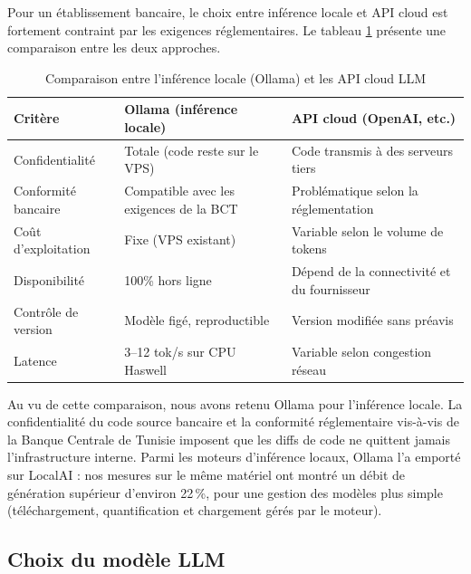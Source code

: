         Pour un établissement bancaire, le choix entre inférence locale et API cloud est
        fortement contraint par les exigences réglementaires. Le tableau \ref{tab:ollama_vs_cloud}
        présente une comparaison entre les deux approches.

        \begin{table}[H]
        \centering
        \begin{tabular}{|m{3.5cm}|m{5cm}|m{5cm}|}
        \hline
        \textbf{Critère} & \textbf{Ollama (inférence locale)} & \textbf{API cloud (OpenAI, etc.)} \\
        \hline
        Confidentialité & Totale (code reste sur le VPS) & Code transmis à des serveurs tiers \\
        \hline
        Conformité bancaire & Compatible avec les exigences de la BCT & Problématique selon la réglementation \\
        \hline
        Coût d'exploitation & Fixe (VPS existant) & Variable selon le volume de tokens \\
        \hline
        Disponibilité & 100\% hors ligne & Dépend de la connectivité et du fournisseur \\
        \hline
        Contrôle de version & Modèle figé, reproductible & Version modifiée sans préavis \\
        \hline
        Latence & 3–12 tok/s sur CPU Haswell & Variable selon congestion réseau \\
        \hline
        \end{tabular}
        \caption{Comparaison entre l'inférence locale (Ollama) et les API cloud LLM}
        \label{tab:ollama_vs_cloud}
        \end{table}

        Au vu de cette comparaison, nous avons retenu Ollama
        \cite{Ollama} pour l'inférence locale. La confidentialité du code source bancaire
        et la conformité réglementaire vis-à-vis de la Banque Centrale de Tunisie imposent
        que les diffs de code ne quittent jamais l'infrastructure interne. Parmi les
        moteurs d'inférence locaux, Ollama l'a emporté sur LocalAI \cite{LocalAI} :
        nos mesures sur le même matériel ont montré un débit de génération supérieur
        d'environ 22\,\%, pour une gestion des modèles plus simple (téléchargement,
        quantification et chargement gérés par le moteur).

    \subsection{Choix du modèle LLM}

